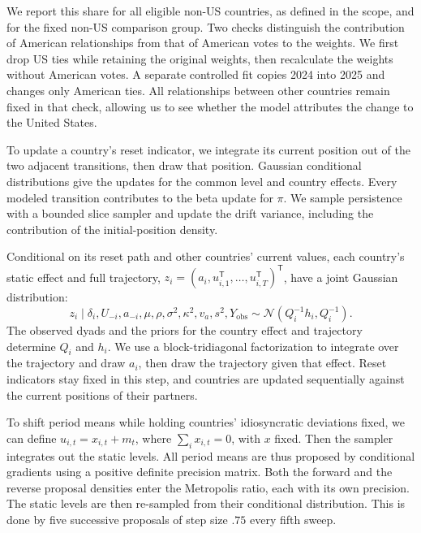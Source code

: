 \documentclass[10pt,authoryear]{elsarticle}
\begin{document}
We report this share for all eligible non-US countries, as defined in the scope, and for the fixed non-US comparison group. Two checks distinguish the contribution of American relationships from that of American votes to the weights. We first drop US ties while retaining the original weights, then recalculate the weights without American votes. A separate controlled fit copies 2024 into 2025 and changes only American ties. All relationships between other countries remain fixed in that check, allowing us to see whether the model attributes the change to the United States.

To update a country's reset indicator, we integrate its current position out of the two adjacent transitions, then draw that position. Gaussian conditional distributions give the updates for the common level and country effects. Every modeled transition contributes to the beta update for $\pi$. We sample persistence with a bounded slice sampler and update the drift variance, including the contribution of the initial-position density.

Conditional on its reset path and other countries' current values, each country's static effect and full trajectory, $z_i=(a_i,u_{i,1}^{\mathsf T},\ldots,u_{i,T}^{\mathsf T})^{\mathsf T}$, have a joint Gaussian distribution:
\[
z_i\mid\delta_i,U_{-i},a_{-i},\mu,\rho,\sigma^2,\kappa^2,v_a,s^2,Y_{\mathrm{obs}}
\sim\mathcal N(Q_i^{-1}h_i,Q_i^{-1}).
\]
The observed dyads and the priors for the country effect and trajectory determine $Q_i$ and $h_i$. We use a block-tridiagonal factorization to integrate over the trajectory and draw $a_i$, then draw the trajectory given that effect. Reset indicators stay fixed in this step, and countries are updated sequentially against the current positions of their partners.

To shift period means while holding countries’ idiosyncratic deviations fixed, we can define $u_{i,t}=x_{i,t}+m_t$, where $\sum_i x_{i,t}=0$, with $x$ fixed. Then the sampler integrates out the static levels. All period means are thus proposed by conditional gradients using a positive definite precision matrix. Both the forward and the reverse proposal densities enter the Metropolis ratio, each with its own precision. The static levels are then re-sampled from their conditional distribution. This is done by five successive proposals of step size $.75$ every fifth sweep.
\end{document}
